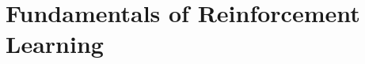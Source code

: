 \setcounter{chapter}{9}

\hypertarget{fundamentals-of-reinforcement-learning}{%
\chapter{Fundamentals of Reinforcement Learning}\label{fundamentals-of-reinforcement-learning}}
